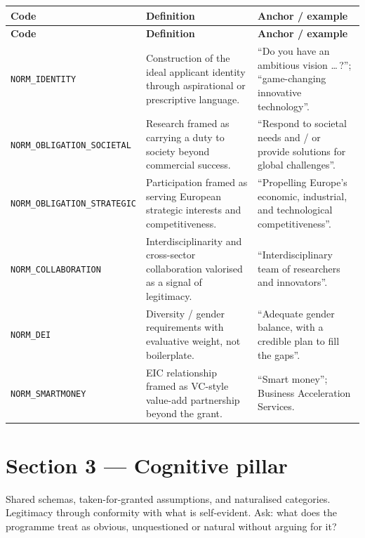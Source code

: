 \begin{longtable}{@{} l p{4.3cm} p{6.3cm} @{}}
\toprule
\textbf{Code} & \textbf{Definition} & \textbf{Anchor / example} \\
\midrule
\endfirsthead
\toprule
\textbf{Code} & \textbf{Definition} & \textbf{Anchor / example} \\
\midrule
\endhead
\bottomrule
\endfoot
\texttt{NORM\_IDENTITY} & Construction of the ideal applicant identity through aspirational or prescriptive language. & \enquote{Do you have an ambitious vision \dots\,?}; \enquote{game-changing innovative technology}. \\
\texttt{NORM\_OBLIGATION\_SOCIETAL} & Research framed as carrying a duty to society beyond commercial success. & \enquote{Respond to societal needs and / or provide solutions for global challenges}. \\
\texttt{NORM\_OBLIGATION\_STRATEGIC} & Participation framed as serving European strategic interests and competitiveness. & \enquote{Propelling Europe's economic, industrial, and technological competitiveness}. \\
\texttt{NORM\_COLLABORATION} & Interdisciplinarity and cross-sector collaboration valorised as a signal of legitimacy. & \enquote{Interdisciplinary team of researchers and innovators}. \\
\texttt{NORM\_DEI} & Diversity / gender requirements with evaluative weight, not boilerplate. & \enquote{Adequate gender balance, with a credible plan to fill the gaps}. \\
\texttt{NORM\_SMARTMONEY} & EIC relationship framed as VC-style value-add partnership beyond the grant. & \enquote{Smart money}; Business Acceleration Services. \\
\end{longtable}

\section*{Section 3 --- Cognitive pillar}

Shared schemas, taken-for-granted assumptions, and naturalised
categories. Legitimacy through conformity with what is self-evident.
Ask: what does the programme treat as obvious, unquestioned or natural
without arguing for it?

